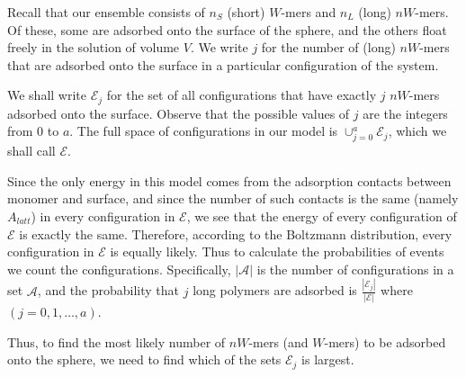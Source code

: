 \documentclass[journal=mamobx,manuscript=article]{achemso}
\begin{document}
Recall that our ensemble consists of $n_S$ (short) $W$-mers and $n_L$ (long) $nW$-mers.
Of these, some are adsorbed onto the surface of the sphere, and the others float freely in the 
solution of volume $V$.  We write $j$ for the number of (long) $nW$-mers that are adsorbed 
onto the surface in a particular configuration of the system.



We shall write $\mathcal{E}_j$ for the set of all configurations that have exactly $j$ $nW$-mers adsorbed 
onto the surface.  Observe that the possible values of $j$ are the integers from 0 to $a$.
The full space of configurations in our model is $\cup_{j=0}^a {\mathcal{E}_j}$, 
which we shall call $\mathcal{E}$.

Since the only energy in this model comes from the adsorption contacts between monomer and surface,
and since the number of such contacts is the same (namely $A_{latt}$) in every configuration
in $\mathcal{E}$, we see that the energy of every configuration of $\mathcal{E}$ is exactly the same.
Therefore, according to the Boltzmann distribution, every configuration in $\mathcal{E}$ is equally
likely. Thus to calculate the probabilities of events we count the configurations.
Specifically, $|\mathcal{A}|$ is the number of configurations in a set $\mathcal{A}$, and the probability that $j$ long polymers are adsorbed is $\frac{|\mathcal{E}_j|}{|\mathcal{E}|}$   where $(j=0,1,\ldots,a)$.

Thus, to find the most likely number of $nW$-mers (and $W$-mers) to be adsorbed onto the sphere,
we need to find which of the sets $\mathcal{E}_j$ is largest.
\end{document}
